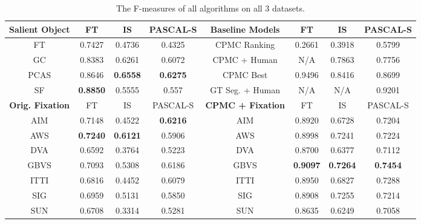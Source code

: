 \begin{table}
\centering
\begin{tabular} {| c | c | c | c || c | c | c | c | }
\hline
\textbf{Salient Object} & FT & IS & PASCAL-S & \textbf{Baseline Models} & FT & IS & PASCAL-S\\
\hline
FT & 0.7427 & 0.4736 & 0.4325 & CPMC Ranking & 0.2661 & 0.3918 & 0.5799\\
\hline
GC & 0.8383 & 0.6261 & 0.6072 & CPMC + Human & N/A & 0.7863 & 0.7756\\
\hline
PCAS & 0.8646 & \textbf{0.6558} & \textbf{0.6275} & CPMC Best & 0.9496 & 0.8416 & 0.8699\\
\hline
SF & \textbf{0.8850} & 0.5555 & 0.557 & GT Seg. + Human & N/A & N/A & 0.9201\\
\hline
\hline
\textbf{Orig. Fixation} & FT & IS & PASCAL-S & \textbf{CPMC + Fixation} & FT & IS & PASCAL-S\\
\hline
AIM & 0.7148 & 0.4522 & \textbf{0.6216} & AIM & 0.8920 & 0.6728 & 0.7204\\
\hline
AWS & \textbf{0.7240} & \textbf{0.6121} & 0.5906 & AWS & 0.8998 & 0.7241 & 0.7224\\
\hline
DVA & 0.6592 & 0.3764 & 0.5223 & DVA & 0.8700 & 0.6377 & 0.7112\\
\hline
GBVS & 0.7093 & 0.5308 & 0.6186 & GBVS & \textbf{0.9097} & \textbf{0.7264} & \textbf{0.7454}\\
\hline
ITTI & 0.6816 & 0.4452 & 0.6079 & ITTI & 0.8950 & 0.6827 & 0.7288\\
\hline
SIG & 0.6959 & 0.5131 & 0.5850 & SIG & 0.8908 & 0.7255 & 0.7214\\
\hline
SUN & 0.6708 & 0.3314 & 0.5281 & SUN & 0.8635 & 0.6249 & 0.7058\\
\hline
\end{tabular}
\caption{The F-measures of all algorithms on all 3 datasets.} \label{tab:fmeasures}
\end{table}

